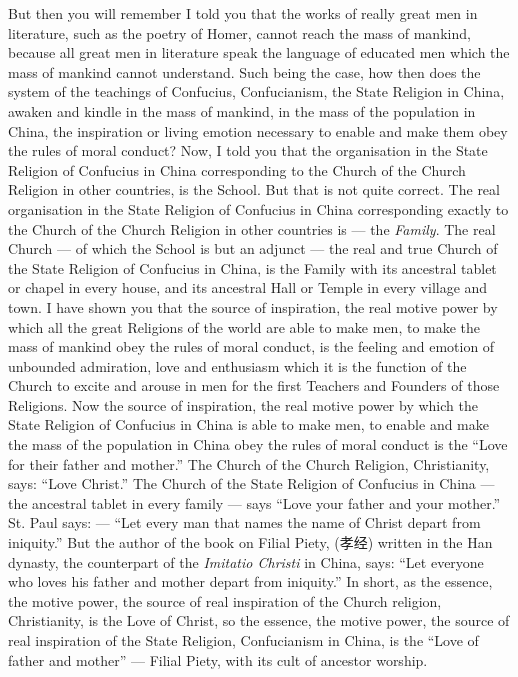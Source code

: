 But then you will remember I told you that the works of really great men in literature, such as the poetry of Homer, cannot reach the mass of mankind, because all great men in literature speak the language of educated men which the mass of mankind cannot understand.
Such being the case, how then does the system of the teachings of Confucius, Confucianism, the State Religion in China, awaken and kindle in the mass of mankind, in the mass of the population in China, the inspiration or living emotion necessary to enable and make them obey the rules of moral conduct?
Now, I told you that the organisation in the State Religion of Confucius in China corresponding to the Church of the Church Religion in other countries, is the School.
But that is not quite correct.
The real organisation in the State Religion of Confucius in China corresponding exactly to the Church of the Church Religion in other countries is --- the \emph{Family}.
The real Church --- of which the School is but an adjunct --- the real and true Church of the State Religion of Confucius in China, is the Family with its ancestral tablet or chapel in every house, and its ancestral Hall or Temple in every village and town.
I have shown you that the source of inspiration, the real motive power by which all the great Religions of the world are able to make men, to make the mass of mankind obey the rules of moral conduct, is the feeling and emotion of unbounded admiration, love and enthusiasm which it is the function of the Church to excite and arouse in men for the first Teachers and Founders of those Religions.
Now the source of inspiration, the real motive power by which the State Religion of Confucius in China is able to make men, to enable and make the mass of the population in China obey the rules of moral conduct is the ``Love for their father and mother.''
The Church of the Church Religion, Christianity, says: ``Love Christ.''
The Church of the State Religion of Confucius in China --- the ancestral tablet in every family --- says ``Love your father and your mother.''
St. Paul says: --- ``Let every man that names the name of Christ depart from iniquity.''
But the author of the book on Filial Piety, (孝经) written in the Han dynasty, the counterpart of the \emph{Imitatio Christi} in China, says: ``Let everyone who loves his father and mother depart from iniquity.''
In short, as the essence, the motive power, the source of real inspiration of the Church religion, Christianity, is the Love of Christ, so the essence, the motive power, the source of real inspiration of the State Religion, Confucianism in China, is the ``Love of father and mother'' --- Filial Piety, with its cult of ancestor worship.

